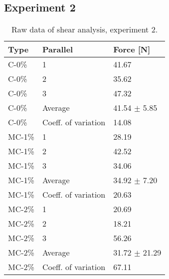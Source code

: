 \subsection{Experiment 2}
\begin{table}[H]
    \caption{Raw data of shear analysis, experiment 2.}
    \centering
    \begin{tabular}{ll|l}
\toprule

\textbf{Type} & \textbf{Parallel} & \textbf{Force [N]}\\

\hline
C-0\%       &   1       & 41.67 \\
C-0\%       &   2       & 35.62 \\
C-0\%       &   3       & 47.32 \\
C-0\%       & Average   & 41.54 $\pm$ 5.85\\
C-0\%       & Coeff. of variation & 14.08 \\
\hline
MC-1\%       &   1       & 28.19 \\
MC-1\%       &   2       & 42.52 \\
MC-1\%       &   3       & 34.06 \\
MC-1\%       & Average   & 34.92 $\pm$ 7.20 \\
MC-1\%       & Coeff. of variation & 20.63 \\
\hline
MC-2\%       &   1       & 20.69 \\
MC-2\%       &   2       & 18.21 \\
MC-2\%       &   3       & 56.26 \\
MC-2\%       & Average   & 31.72 $\pm$ 21.29 \\
MC-2\%       & Coeff. of variation & 67.11 \\
\bottomrule
    \end{tabular}%
    \label{tab:RawData:ShearForce:Exp2}
\end{table}

